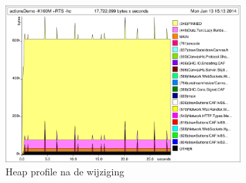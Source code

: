 \begin{figure}[H]
\begin{center}
\includegraphics[keepaspectratio,width=0.8\textwidth]{./images/actionsDemoAfterByteStrings.png}
\caption{Heap profile na de wijziging}
\label{fig:performance2}
\end{center}
\end{figure}
